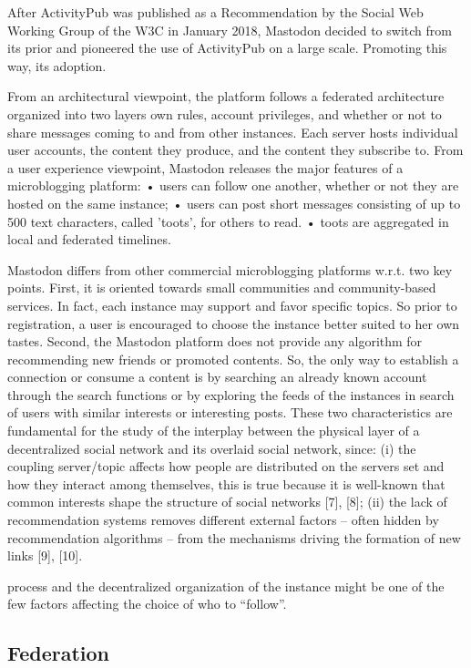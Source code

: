 After ActivityPub was published as a Recommendation by the Social Web Working Group of the W3C in January 2018, Mastodon decided to switch from its prior and pioneered the use of ActivityPub on a large scale. Promoting this way, its adoption.

From an architectural viewpoint, the platform follows a federated architecture organized into two layers  own rules, account privileges, and whether or not to share messages coming to and from other instances. Each server hosts individual user accounts, the content they produce, and the content they subscribe to. From a user experience viewpoint, Mastodon releases the major features of a microblogging platform: • users can follow one another, whether or not they are hosted on the same instance; • users can post short messages consisting of up to 500 text characters, called ’toots’, for others to read. • toots are aggregated in local and federated timelines.

Mastodon differs from other commercial microblogging platforms w.r.t. two key points. First, it is oriented towards small communities and community-based services. In fact, each instance may support and favor specific topics. So prior to registration, a user is encouraged to choose the instance better suited to her own tastes. Second, the Mastodon platform does not provide any algorithm for recommending new friends or promoted contents. So, the only way to establish a connection or consume a content is by searching an already known account through the search functions or by exploring the feeds of the instances in search of users with similar interests or interesting posts. These two characteristics are fundamental for the study of the interplay between the physical layer of a decentralized social network and its overlaid social network, since: (i) the coupling server/topic affects how people are distributed on the servers set and how they interact among themselves, this is true because it is well-known that common interests shape the structure of social networks [7], [8]; (ii) the lack of recommendation systems removes different external factors – often hidden by recommendation algorithms – from the mechanisms driving the formation of new links [9], [10].

process and the decentralized organization of the instance might be one of the few factors affecting the choice of who to “follow”.

\subsection{Federation}

